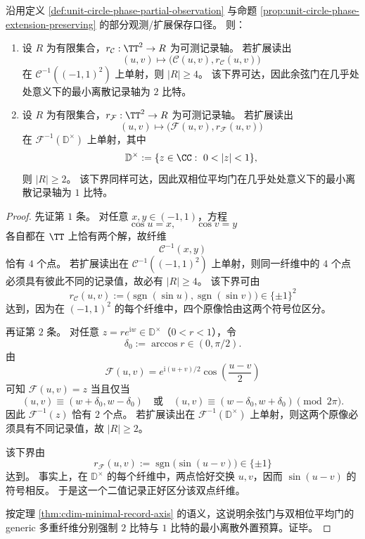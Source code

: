 \begin{proposition}\label{prop:cdim-biphase-cosine-record-axis-lower-bound}
沿用定义 \ref{def:unit-circle-phase-partial-observation} 与命题 \ref{prop:unit-circle-phase-extension-preserving} 的部分观测/扩展保存口径。
则：
\begin{enumerate}
  \item 设 \(R\) 为有限集合，\(r_{\mathcal C}:\TT^2\to R\) 为可测记录轴。
  若扩展读出
  \[
  (u,v)\longmapsto \bigl(\mathcal C(u,v),r_{\mathcal C}(u,v)\bigr)
  \]
  在 \(\mathcal C^{-1}((-1,1)^2)\) 上单射，则 \(|R|\ge 4\)。
  该下界可达，因此余弦门在几乎处处意义下的最小离散记录轴为 \(2\) 比特。
  \item 设 \(R\) 为有限集合，\(r_{\mathcal F}:\TT^2\to R\) 为可测记录轴。
  若扩展读出
  \[
  (u,v)\longmapsto \bigl(\mathcal F(u,v),r_{\mathcal F}(u,v)\bigr)
  \]
  在 \(\mathcal F^{-1}(\mathbb D^\times)\) 上单射，其中
  \[
  \mathbb D^\times:=\{z\in\CC:\ 0<|z|<1\},
  \]
  则 \(|R|\ge 2\)。
  该下界同样可达，因此双相位平均门在几乎处处意义下的最小离散记录轴为 \(1\) 比特。
\end{enumerate}
\end{proposition}
\begin{proof}
先证第 \(1\) 条。
对任意 \(x,y\in(-1,1)\)，方程
\[
\cos u=x,
\qquad
\cos v=y
\]
各自都在 \(\TT\) 上恰有两个解，故纤维
\[
\mathcal C^{-1}(x,y)
\]
恰有 \(4\) 个点。
若扩展读出在 \(\mathcal C^{-1}((-1,1)^2)\) 上单射，则同一纤维中的 \(4\) 个点必须具有彼此不同的记录值，故必有 \(|R|\ge 4\)。
该下界可由
\[
r_{\mathcal C}(u,v):=\bigl(\operatorname{sgn}(\sin u),\operatorname{sgn}(\sin v)\bigr)\in\{\pm1\}^2
\]
达到，因为在 \((-1,1)^2\) 的每个纤维中，四个原像恰由这两个符号位区分。

再证第 \(2\) 条。
对任意 \(z=re^{\mathrm{i}w}\in\mathbb D^\times\)（\(0<r<1\)），令
\[
\delta_0:=\arccos r\in(0,\pi/2).
\]
由
\[
\mathcal F(u,v)=e^{\mathrm{i}(u+v)/2}\cos\!\left(\frac{u-v}{2}\right)
\]
可知 \(\mathcal F(u,v)=z\) 当且仅当
\[
(u,v)\equiv (w+\delta_0,w-\delta_0)
\quad\text{或}\quad
(u,v)\equiv (w-\delta_0,w+\delta_0)
\pmod{2\pi}.
\]
因此 \(\mathcal F^{-1}(z)\) 恰有 \(2\) 个点。
若扩展读出在 \(\mathcal F^{-1}(\mathbb D^\times)\) 上单射，则这两个原像必须具有不同记录值，故 \(|R|\ge 2\)。

该下界由
\[
r_{\mathcal F}(u,v):=\operatorname{sgn}\bigl(\sin(u-v)\bigr)\in\{\pm1\}
\]
达到。
事实上，在 \(\mathbb D^\times\) 的每个纤维中，两点恰好交换 \(u,v\)，因而 \(\sin(u-v)\) 的符号相反。
于是这一个二值记录正好区分该双点纤维。

按定理 \ref{thm:cdim-minimal-record-axis} 的语义，这说明余弦门与双相位平均门的 generic 多重纤维分别强制 \(2\) 比特与 \(1\) 比特的最小离散外置预算。证毕。
\end{proof}

\endinput
